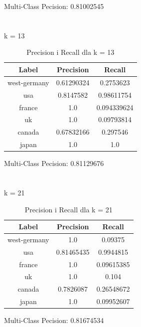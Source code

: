 \documentclass{classrep}
\begin{document}
Multi-Class Pecision: 0.81002545\\
\\
\\
k = 13
\begin{table}[H]
\begin{tabular}{|c|c|c|}
\hline
Label        & Precision  & Recall      \\ \hline
west-germany & 0.61290324 & 0.2753623   \\ \hline
usa          & 0.8147582  & 0.98611754  \\ \hline
france       & 1.0        & 0.094339624 \\ \hline
uk           & 1.0        & 0.09793814  \\ \hline
canada       & 0.67832166 & 0.297546    \\ \hline
japan        & 1.0        & 1.0         \\ \hline
\end{tabular}
\caption{Precision i Recall dla k = 13}
\end{table}
Multi-Class Pecision: 0.81129676\\
\\
\\
k = 21
\begin{table}[H]
\begin{tabular}{|c|c|c|}
\hline
Label        & Precision  & Recall     \\ \hline
west-germany & 1.0        & 0.09375    \\ \hline
usa          & 0.81465435 & 0.9944815  \\ \hline
france       & 1.0        & 0.09615385 \\ \hline
uk           & 1.0        & 0.104      \\ \hline
canada       & 0.7826087  & 0.26548672 \\ \hline
japan        & 1.0        & 0.09952607 \\ \hline
\end{tabular}
\caption{Precision i Recall dla k = 21}
\end{table}
Multi-Class Pecision: 0.81674534
\end{document}
